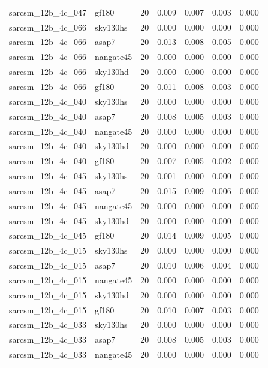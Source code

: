 \begin{tabular}{llrrrrr}
sarcsm\_12b\_4c\_047 & gf180 & 20 & 0.009 & 0.007 & 0.003 & 0.000 \\
sarcsm\_12b\_4c\_066 & sky130hs & 20 & 0.000 & 0.000 & 0.000 & 0.000 \\
sarcsm\_12b\_4c\_066 & asap7 & 20 & 0.013 & 0.008 & 0.005 & 0.000 \\
sarcsm\_12b\_4c\_066 & nangate45 & 20 & 0.000 & 0.000 & 0.000 & 0.000 \\
sarcsm\_12b\_4c\_066 & sky130hd & 20 & 0.000 & 0.000 & 0.000 & 0.000 \\
sarcsm\_12b\_4c\_066 & gf180 & 20 & 0.011 & 0.008 & 0.003 & 0.000 \\
sarcsm\_12b\_4c\_040 & sky130hs & 20 & 0.000 & 0.000 & 0.000 & 0.000 \\
sarcsm\_12b\_4c\_040 & asap7 & 20 & 0.008 & 0.005 & 0.003 & 0.000 \\
sarcsm\_12b\_4c\_040 & nangate45 & 20 & 0.000 & 0.000 & 0.000 & 0.000 \\
sarcsm\_12b\_4c\_040 & sky130hd & 20 & 0.000 & 0.000 & 0.000 & 0.000 \\
sarcsm\_12b\_4c\_040 & gf180 & 20 & 0.007 & 0.005 & 0.002 & 0.000 \\
sarcsm\_12b\_4c\_045 & sky130hs & 20 & 0.001 & 0.000 & 0.000 & 0.000 \\
sarcsm\_12b\_4c\_045 & asap7 & 20 & 0.015 & 0.009 & 0.006 & 0.000 \\
sarcsm\_12b\_4c\_045 & nangate45 & 20 & 0.000 & 0.000 & 0.000 & 0.000 \\
sarcsm\_12b\_4c\_045 & sky130hd & 20 & 0.000 & 0.000 & 0.000 & 0.000 \\
sarcsm\_12b\_4c\_045 & gf180 & 20 & 0.014 & 0.009 & 0.005 & 0.000 \\
sarcsm\_12b\_4c\_015 & sky130hs & 20 & 0.000 & 0.000 & 0.000 & 0.000 \\
sarcsm\_12b\_4c\_015 & asap7 & 20 & 0.010 & 0.006 & 0.004 & 0.000 \\
sarcsm\_12b\_4c\_015 & nangate45 & 20 & 0.000 & 0.000 & 0.000 & 0.000 \\
sarcsm\_12b\_4c\_015 & sky130hd & 20 & 0.000 & 0.000 & 0.000 & 0.000 \\
sarcsm\_12b\_4c\_015 & gf180 & 20 & 0.010 & 0.007 & 0.003 & 0.000 \\
sarcsm\_12b\_4c\_033 & sky130hs & 20 & 0.000 & 0.000 & 0.000 & 0.000 \\
sarcsm\_12b\_4c\_033 & asap7 & 20 & 0.008 & 0.005 & 0.003 & 0.000 \\
sarcsm\_12b\_4c\_033 & nangate45 & 20 & 0.000 & 0.000 & 0.000 & 0.000 \\

\end{tabular}
